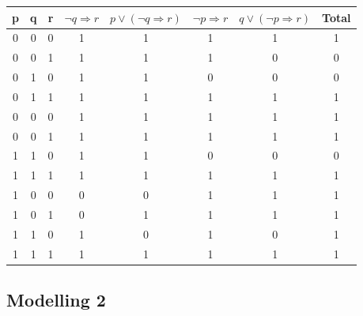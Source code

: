 \begin{large}
\begin{enumerate}[label=(\alph*)]
    \begin{tabular}{c|c|c|c|c|c|c||c}
        p & q & r & $ \neg q \Rightarrow r $ & $ p \lor (\neg q \Rightarrow r) $ & $ \neg p \Rightarrow r $ &
        $ q \lor (\neg p \Rightarrow r) $ & Total \\
        \hline\hline
        0 & 0 & 0 & 1 & 1 & 1 & 1 & 1 \\
        \hline
        0 & 0 & 1 & 1 & 1 & 1 & 0 & 0\\
        \hline
        0 & 1 & 0 & 1 & 1 & 0 & 0 & 0 \\
        \hline
        0 & 1 & 1 & 1 & 1 & 1 & 1 & 1 \\
        \hline
        0 & 0 & 0 & 1 & 1 & 1 & 1 & 1 \\
        \hline
        0 & 0 & 1 & 1 & 1 & 1 & 1 & 1 \\
        \hline
        1 & 1 & 0 & 1 & 1 & 0 & 0 & 0 \\
        \hline
        1 & 1 & 1 & 1 & 1 & 1 & 1 & 1 \\
        \hline
        1 & 0 & 0 & 0 & 0 & 1 & 1 & 1 \\
        \hline
        1 & 0 & 1 & 0 & 1 & 1 & 1 & 1 \\
        \hline
        1 & 1 & 0 & 1 & 0 & 1 & 0 & 1 \\
        \hline
        1 & 1 & 1 & 1 & 1 & 1 & 1 & 1 \\
        \hline
    \end{tabular}
\end{enumerate} 
\end{large}

\subsection{Modelling 2}
\begin{large}
    
\end{large}